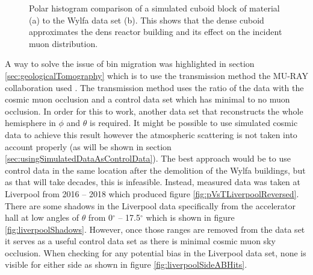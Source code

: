 \begin{figure}[!h]
\begin{subfigure}{.5\textwidth}
  \captionsetup{width=.9\linewidth}
  \caption{}
  \label{subFig:measuredWylfaAttenuation}
\end{subfigure}
\caption[Polar histogram comparison of a simulated cuboid block of material.]{Polar histogram comparison of a simulated cuboid block of material (a) to the Wylfa data set (b). This shows that the dense cuboid approximates the dens reactor building and its effect on the incident muon distribution.}
\label{fig:sideBySideComparisonTopDownCirc}
\end{figure}

A way to solve the issue of bin migration was highlighted in section \ref{sec:geologicalTomography} which is to use the transmission method the MU-RAY collaboration used \cite{Ambrosino_2014}. The transmission method uses the ratio of the data with the cosmic muon occlusion and a control data set which has minimal to no muon occlusion. In order for this to work, another data set that reconstructs the whole hemisphere in $\phi$ and $\theta$ is required. It might be possible to use simulated cosmic data to achieve this result however the atmospheric scattering is not taken into account properly (as will be shown in section \ref{sec:usingSimulatedDataAsControlData}). The best approach would be to use control data in the same location after the demolition of the Wylfa buildings, but as that will take decades, this is infeasible. Instead, measured data was taken at Liverpool from 2016 -- 2018 which produced figure \ref{fig:pVsTLiverpoolReversed}. There are some shadows in the Liverpool data specifically from the accelerator hall at low angles of $\theta$ from 0$^\circ$ -- 17.5$^\circ$ which is shown in figure \ref{fig:liverpoolShadows}. However, once those ranges are removed from the data set it serves as a useful control data set as there is minimal cosmic muon sky occlusion. When checking for any potential bias in the Liverpool data set, none is visible for either side as shown in figure \ref{fig:liverpoolSideABHits}. 

